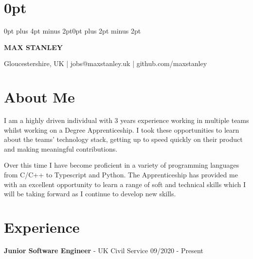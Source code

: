 \documentclass{article}
\begin{document}
\setlength\parindent{0pt}
\setlength{\parskip}{.8em} 
\titlespacing\section{0pt}{0pt plus 4pt minus 2pt}{0pt plus 2pt minus 2pt}

\newcommand*\emptycirc[1][1ex]{\tikz\draw (0,0) circle (#1);}
\newcommand*\fullcirc[1][1ex]{\tikz\fill (0,0) circle (#1);}

\newcount\myloopcounter
\newcommand{\repeatit}[2][10]{%
  \myloopcounter0%
  \loop\ifnum\myloopcounter < #1 %
  #2%
  \advance\myloopcounter by 1 %
  \repeat %
}

\begin{center}
\begin{huge}
\textbf{MAX STANLEY}
\end{huge}

Gloucestershire, UK
|
jobs@maxstanley.uk
|
github.com/maxstanley

\end{center}

\section*{About Me}

I am a highly driven individual with 3 years experience working in multiple teams whilst working on a Degree Apprenticeship.
I took these opportunities to learn about the teams' technology stack, getting up to speed quickly on their product and making meaningful contributions.

Over this time I have become proficient in a variety of programming languages from C/C++ to Typescript and Python.
The Apprenticeship has provided me with an excellent opportunity to learn a range of soft and technical skills which I will be taking forward as I continue to develop new skills.

\section*{Experience}

\textbf{Junior Software Engineer} - UK Civil Service \hfill 09/2020 - Present
\end{document}
